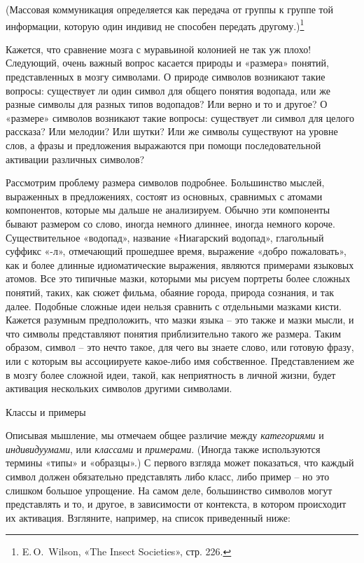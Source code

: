 \documentclass[../main.tex]{subfiles}
\begin{document}
(Массовая коммуникация определяется как передача от группы к группе той информации, которую один индивид не способен передать другому.)\footnote{E.\,O.~Wilson, «The Insect Societies», стр. 226.}

Кажется, что сравнение мозга с муравьиной колонией не так уж плохо! Следующий, очень важный вопрос касается природы и «размера» понятий, представленных в мозгу символами. О природе символов возникают такие вопросы: существует ли один символ для общего понятия водопада, или же разные символы для разных типов водопадов? Или верно и то и другое? О «размере» символов возникают такие вопросы: существует ли символ для целого рассказа? Или мелодии? Или шутки? Или же символы существуют на уровне слов, а фразы и предложения выражаются при помощи последовательной активации различных символов?

Рассмотрим проблему размера символов подробнее. Большинство мыслей, выраженных в предложениях, состоят из основных, сравнимых с атомами компонентов, которые мы дальше не анализируем. Обычно эти компоненты бывают размером со слово, иногда немного длиннее, иногда немного короче. Существительное «водопад», название «Ниагарский водопад», глагольный суффикс «-л», отмечающий прошедшее время, выражение «добро пожаловать», как и более длинные идиоматические выражения, являются примерами языковых атомов. Все это типичные мазки, которыми мы рисуем портреты более сложных понятий, таких, как сюжет фильма, обаяние города, природа сознания, и так далее. Подобные сложные идеи нельзя сравнить с отдельными мазками кисти. Кажется разумным предположить, что мазки языка \--- это также и мазки мысли, и что символы представляют понятия приблизительно такого же размера. Таким образом, символ \--- это нечто такое, для чего вы знаете слово, или готовую фразу, или с которым вы ассоциируете какое-либо имя собственное. Представлением же в мозгу более сложной идеи, такой, как неприятность в личной жизни, будет активация нескольких символов другими символами.

Классы и примеры

Описывая мышление, мы отмечаем общее различие между \emph{категориями} и \emph{индивидуумами}, или \emph{классами} и \emph{примерами}. (Иногда также используются термины «типы» и «образцы».) С первого взгляда может показаться, что каждый символ должен обязательно представлять либо класс, либо пример \--- но это слишком большое упрощение. На самом деле, большинство символов могут представлять и то, и другое, в зависимости от контекста, в котором происходит их активация. Взгляните, например, на список приведенный ниже:
\end{document}
